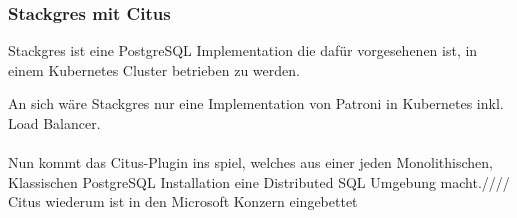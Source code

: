 \subsubsection{Stackgres mit Citus}
\begin{flushleft} 
Stackgres ist eine PostgreSQL Implementation die dafür vorgesehenen ist, in einem Kubernetes Cluster betrieben zu werden.
\end{flushleft} 
\begin{flushleft}
An sich wäre Stackgres nur eine Implementation von Patroni in Kubernetes inkl. Load Balancer.\\\\
Nun kommt das Citus-Plugin ins spiel, welches aus einer jeden Monolithischen, Klassischen PostgreSQL Installation eine Distributed SQL Umgebung macht.////
Citus wiederum ist in den Microsoft Konzern eingebettet
\end{flushleft} 